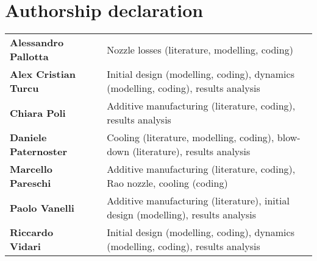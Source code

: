 \section*{Authorship declaration}

\vspace*{5mm}
\newcommand{\x}{-3mm}
{
\renewcommand{\arraystretch}{1.7}
\begin{tabular}{lll}
    \textbf{Alessandro Pallotta} & \hspace*{\x} &
    Nozzle losses (literature, modelling, coding)
    \\
    \textbf{Alex Cristian Turcu} & \hspace*{\x} &
    Initial design (modelling, coding), dynamics (modelling, coding), results analysis
    \\
    \textbf{Chiara Poli} & \hspace*{\x} &
    Additive manufacturing (literature, coding), results analysis
    \\
    \textbf{Daniele Paternoster} & \hspace*{\x} &
    Cooling (literature, modelling, coding), blow-down (literature), results analysis
    \\
    \textbf{Marcello Pareschi} & \hspace*{\x} &
    Additive manufacturing (literature, coding), Rao nozzle, cooling (coding)
    \\
    \textbf{Paolo Vanelli} & \hspace*{\x} &
    Additive manufacturing (literature), initial design (modelling), results analysis
    \\
    \textbf{Riccardo Vidari} & \hspace*{\x} &
    Initial design (modelling, coding), dynamics (modelling, coding), results analysis
\end{tabular}
}